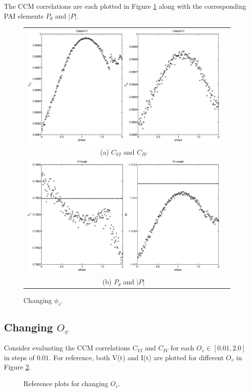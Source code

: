 \documentclass{article}
\begin{document}
The CCM correlations are each plotted in Figure \ref{fig:Pv} along with the corresponding PAI elements $P_\theta$ and $|P|$.
\begin{figure}[H]
\begin{tabular}{cc}
\includegraphics[scale=0.5]{RLcirc_varyV_phase2.eps} \\
(a) $C_{VI}$ and $C_{IV}$ \\[6pt]
\includegraphics[scale=0.5]{RLcirc_varyV_phase.eps} \\
(b) $P_\theta$ and $|P|$ \\[6pt]
\end{tabular}
\caption{Changing $\phi_v$.}
\label{fig:Pv}
\end{figure}

\subsection{Changing $O_v$}
Consider evaluating the CCM correlations $C_{VI}$ and $C_{IV}$ for each $O_v\in[0.01,2.0]$ in steps of $0.01$.  For reference, both V(t) and I(t) are plotted for different $O_v$ in Figure \ref{fig:Ovref}.
\begin{figure}[H]
\caption{Reference plots for changing $O_v$.}
\label{fig:Ovref}
\end{figure}
\end{document}
